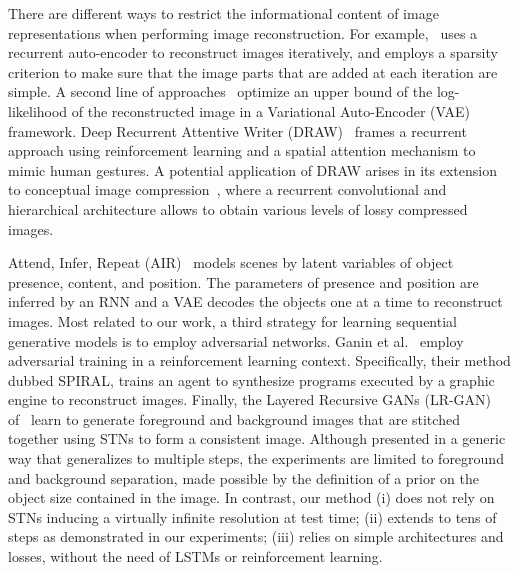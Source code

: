 \documentclass[10pt,twocolumn,letterpaper]{article}
\def\mypar#1{\vspace{1mm}{\bf #1.}\hspace{1mm}}
\begin{document}
\mypar{Unsupervised deep sequential generative models}
There are different ways to restrict the informational content of image representations when performing image reconstruction. For example,~\cite{Rolfe2013discriminative} uses a recurrent auto-encoder to reconstruct images iteratively, and employs a sparsity criterion to make sure that the image parts that are added at each iteration are simple. 
A second line of approaches~\cite{Gregor2015DRAW,Eslami2016AIR,gregor2016compression} optimize an upper bound of the log-likelihood {of the reconstructed image} in a Variational Auto-Encoder (VAE)~\cite{kingma14iclr} framework.
Deep Recurrent Attentive Writer (DRAW)~\cite{Gregor2015DRAW} frames a recurrent approach using reinforcement learning and a spatial attention mechanism to mimic human gestures. A potential application of DRAW arises in its extension to conceptual image compression~\cite{gregor2016compression}, where a recurrent convolutional and hierarchical architecture allows to obtain various levels of lossy compressed images.

Attend, Infer, Repeat (AIR)~\cite{Eslami2016AIR} models scenes by latent variables of object presence, content, and position. The parameters of presence and position are inferred by an RNN and a VAE decodes the objects one at a time to reconstruct images. 
Most related to our work, a third strategy for learning sequential generative models is to employ adversarial networks. Ganin et al.~\cite{ganin2018synthesizing} employ adversarial training in a reinforcement learning context. Specifically, their method dubbed SPIRAL, trains an agent to synthesize programs executed by a graphic engine to reconstruct images.    
Finally, the Layered Recursive GANs (LR-GAN) of~\cite{Yang2017LRGAN} learn to generate foreground and background images that are stitched together using STNs to form a consistent image. Although presented in a generic way that generalizes to multiple steps, the experiments are limited to foreground and background separation, made possible by the definition of a prior on the object size contained in the image. 
In contrast, our method (i) does not rely on STNs inducing a virtually infinite resolution at test time; (ii) extends to tens of steps as demonstrated in our experiments; (iii) relies on  simple architectures and losses, without the need of LSTMs or reinforcement learning.  


\end{document}
